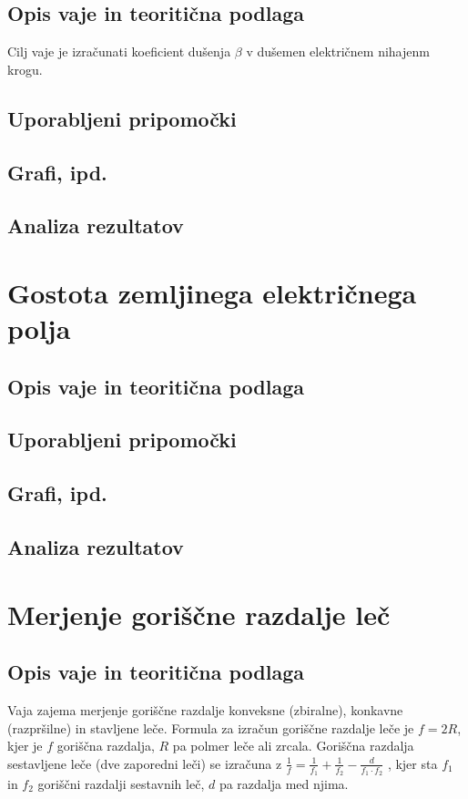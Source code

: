 \documentclass[12pt]{article}
\begin{document}
    \subsection*{Opis vaje in teoritična podlaga}
    Cilj vaje je izračunati koeficient dušenja $\beta$ v dušemen električnem nihajenm krogu.
    
    \subsection*{Uporabljeni pripomočki}
    \subsection*{Grafi, ipd.}
    \subsection*{Analiza rezultatov}

\newpage
\section{Gostota zemljinega električnega polja}
    \subsection*{Opis vaje in teoritična podlaga}
    \subsection*{Uporabljeni pripomočki}
    \subsection*{Grafi, ipd.}
    \subsection*{Analiza rezultatov}

\newpage
\section{Merjenje goriščne razdalje leč}
    \subsection*{Opis vaje in teoritična podlaga}
    Vaja zajema merjenje goriščne razdalje konveksne (zbiralne), konkavne (razpršilne) in 
    stavljene leče. Formula za izračun goriščne razdalje leče je $f = 2R$, kjer je $f$ 
    goriščna razdalja, $R$ pa polmer leče ali zrcala. Goriščna razdalja sestavljene leče
    (dve zaporedni leči) se izračuna z $\frac{1}{f} = \frac{1}{f_1} + \frac{1}{f_2} - \frac{d}{f_1 \cdot f_2}$
    \cite{lece}, kjer sta $f_1$ in $f_2$ goriščni razdalji sestavnih leč, $d$ pa razdalja med njima.
\end{document}
